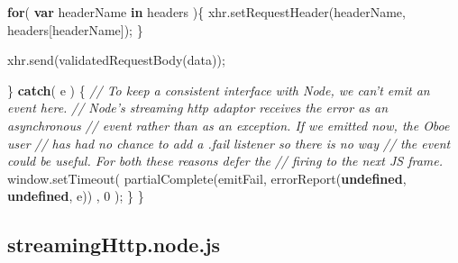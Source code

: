 \documentclass[12pt, ]{article}
\newenvironment{Shaded}{}{}
\newcommand{\KeywordTok}[1]{\textcolor[rgb]{0.00,0.44,0.13}{\textbf{{#1}}}}
\newcommand{\DecValTok}[1]{\textcolor[rgb]{0.25,0.63,0.44}{{#1}}}
\newcommand{\CommentTok}[1]{\textcolor[rgb]{0.38,0.63,0.69}{\textit{{#1}}}}
\newcommand{\OtherTok}[1]{\textcolor[rgb]{0.00,0.44,0.13}{{#1}}}
\newcommand{\FunctionTok}[1]{\textcolor[rgb]{0.02,0.16,0.49}{{#1}}}
\newcommand{\NormalTok}[1]{{#1}}
\begin{document}
\begin{Shaded}
\begin{Highlighting}[]
      \KeywordTok{for}\NormalTok{( }\KeywordTok{var} \NormalTok{headerName }\KeywordTok{in} \NormalTok{headers )\{}
         \OtherTok{xhr}\NormalTok{.}\FunctionTok{setRequestHeader}\NormalTok{(headerName, headers[headerName]);}
      \NormalTok{\}}
      
      \OtherTok{xhr}\NormalTok{.}\FunctionTok{send}\NormalTok{(}\FunctionTok{validatedRequestBody}\NormalTok{(data));}
      
   \NormalTok{\} }\KeywordTok{catch}\NormalTok{( e ) \{}
      \CommentTok{// To keep a consistent interface with Node, we can't emit an event here.}
      \CommentTok{// Node's streaming http adaptor receives the error as an asynchronous}
      \CommentTok{// event rather than as an exception. If we emitted now, the Oboe user}
      \CommentTok{// has had no chance to add a .fail listener so there is no way}
      \CommentTok{// the event could be useful. For both these reasons defer the}
      \CommentTok{// firing to the next JS frame.  }
      \OtherTok{window}\NormalTok{.}\FunctionTok{setTimeout}\NormalTok{(}
         \FunctionTok{partialComplete}\NormalTok{(emitFail, }\FunctionTok{errorReport}\NormalTok{(}\KeywordTok{undefined}\NormalTok{, }\KeywordTok{undefined}\NormalTok{, e))}
      \NormalTok{,  }\DecValTok{0}
      \NormalTok{);}
   \NormalTok{\}            }
\NormalTok{\}}
\end{Highlighting}
\end{Shaded}

\pagebreak

\subsection{streamingHttp.node.js}\label{headerux5fstreamingHttp.node}

\label{src_streamingHttp.node}
\end{document}
